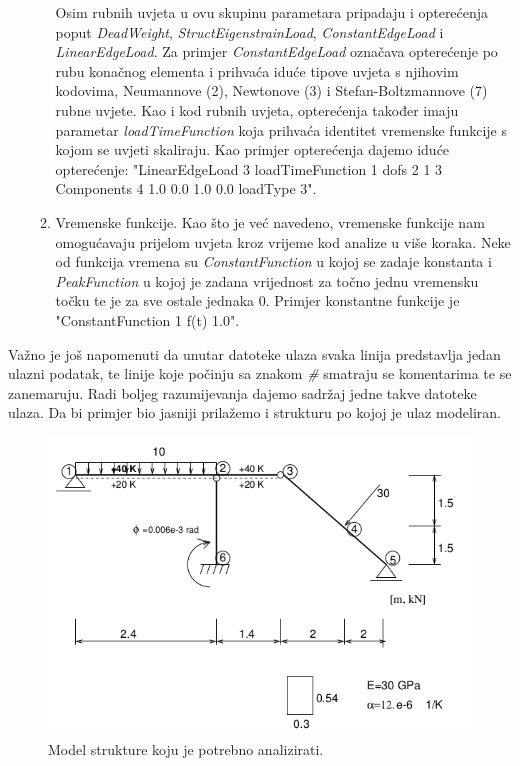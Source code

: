 \documentclass[a4paper,twoside,12pt]{memoir} %
\begin{document}
\begin{enumerate}
\begin{enumerate}
        Osim rubnih uvjeta u ovu skupinu parametara pripadaju i opterećenja poput \textit{DeadWeight}, \textit{StructEigenstrainLoad}, \textit{ConstantEdgeLoad} i \textit{LinearEdgeLoad}. Za primjer \textit{ConstantEdgeLoad} označava opterećenje po rubu konačnog elementa i prihvaća iduće tipove uvjeta s njihovim kodovima, Neumannove (2), Newtonove (3) i Stefan-Boltzmannove (7) rubne uvjete. Kao i kod rubnih uvjeta, opterećenja također imaju parametar \textit{loadTimeFunction} koja prihvaća identitet vremenske funkcije s kojom se uvjeti skaliraju. Kao primjer opterećenja dajemo iduće opterećenje: "LinearEdgeLoad 3 loadTimeFunction 1 dofs 2 1 3 Components 4 1.0 0.0 1.0 0.0 loadType 3".
        \item Vremenske funkcije. Kao što je već navedeno, vremenske funkcije nam omogućavaju prijelom uvjeta kroz vrijeme kod analize u više koraka. Neke od funkcija vremena su \textit{ConstantFunction} u kojoj se zadaje konstanta i \textit{PeakFunction} u kojoj je zadana vrijednost za točno jednu vremensku točku te je za sve ostale jednaka 0. Primjer konstantne funkcije je "ConstantFunction 1 f(t) 1.0".
    \end{enumerate}
\end{enumerate}

Važno je još napomenuti da unutar datoteke ulaza svaka linija predstavlja jedan ulazni podatak, te linije koje počinju sa znakom \textit{\#} smatraju se komentarima te se zanemaruju. Radi boljeg razumijevanja dajemo sadržaj jedne takve datoteke ulaza. Da bi primjer bio jasniji prilažemo i strukturu po kojoj je ulaz modeliran.

\begin{figure}[h!t]
\begin{center}
\includegraphics[scale=0.51]{pictures/chapter_oofem/structure_to_analyze.png}
\caption{Model strukture koju je potrebno analizirati. \cite{oofem-web}}
\label{fig:Structure_to_analyze}
\end{center}
\end{figure}
\end{document}

